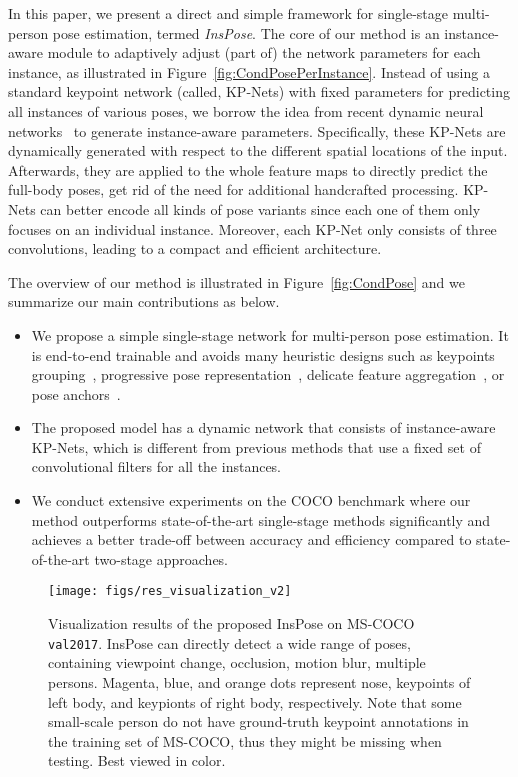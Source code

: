 \documentclass[sigconf]{acmart}
\begin{document}
In this paper, we present a direct and simple framework for single-stage multi-person pose estimation, termed \emph{InsPose}.
The core of our method is an instance-aware module to adaptively adjust (part of) the network parameters for each instance, as illustrated in Figure~\ref{fig:CondPosePerInstance}.
Instead of using a standard keypoint network (called, KP-Nets) with fixed parameters for predicting all instances of various poses, we borrow the idea from recent dynamic neural networks~\cite{yang2019condconv,Chen_2020_CVPR,DBLP:conf/nips/DenilSDRF13,jia2016dynamic} to generate instance-aware parameters.
Specifically, these KP-Nets are dynamically generated with respect to the different spatial locations of the input.
Afterwards, they are applied to the whole feature maps to directly predict the full-body poses, get rid of the need for additional handcrafted processing.
KP-Nets can better encode all kinds of pose variants since each one of them only focuses on an individual instance.
Moreover, each KP-Net only consists of three  convolutions, leading to a compact and efficient architecture.

The overview of our method is illustrated in Figure~\ref{fig:CondPose} and we summarize our main contributions as below.

\begin{itemize}

\item We propose a simple single-stage network for multi-person pose estimation. It is end-to-end trainable and avoids many heuristic designs such as keypoints grouping~\cite{cheng2020higherhrnet}, progressive pose representation~\cite{nie2019single}, delicate feature aggregation~\cite{tian2019directpose}, or pose anchors~\cite{wei2020point}.

\item The proposed model has a dynamic network that consists of instance-aware KP-Nets, which is different from previous methods that use a fixed set of convolutional filters for all the instances.

\item We conduct extensive experiments on the COCO benchmark where our method outperforms state-of-the-art single-stage methods significantly and achieves a better trade-off between accuracy and efficiency compared to state-of-the-art two-stage approaches.

\end{itemize}


\begin{figure*}[t]
  \centering
  \texttt{[image: figs/res\_visualization\_v2]}
  \caption{Visualization results of the proposed InsPose on MS-COCO \texttt{val2017}. InsPose can directly detect a wide range of poses, containing viewpoint change, occlusion, motion blur, multiple persons. Magenta, blue, and orange dots represent nose, keypoints of left body, and keypionts of right body, respectively. Note that some small-scale person do not have ground-truth keypoint annotations in the training set of MS-COCO, thus they might be missing when testing. Best viewed in color.}
  \label{fig:CondPoseVisRes}
\end{figure*}
\end{document}
